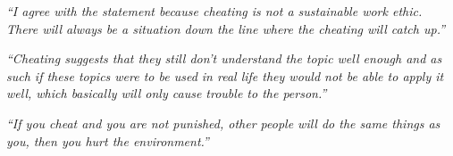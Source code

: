 \documentclass[12pt]{beamer}
\newcommand\ans[1]{{\it ``#1''}}
\newcommand\gap{\vspace{5mm}}
\begin{document}
\begin{frame}
  
\ans{I agree with the statement because cheating is not a sustainable work ethic.  There will always be a situation down the line where the cheating will catch up.}

\gap

\ans{Cheating suggests that they still don't understand the topic well enough and as such if these topics were to be used in real life they would not be able to apply it well, which basically will only cause trouble to the person.}

\gap

\ans{If you cheat and you are not punished, other people will do the same things as you, then you hurt the environment.}






\end{frame}
\end{document}
